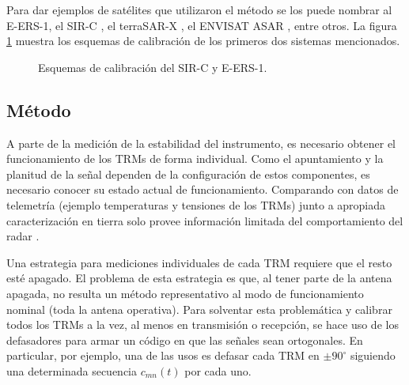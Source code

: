 Para dar ejemplos de satélites que utilizaron el método se los puede nombrar al E-ERS-1, el SIR-C \cite{Curlander1991}, el 
terraSAR-X \cite{Schwerdt2005}, el ENVISAT ASAR \cite{Loop}, entre otros. La figura \ref{fig:calibrMethods} muestra los esquemas
de calibración de los primeros dos sistemas mencionados.

\begin{figure}[H]
	\centering
	\caption{Esquemas de calibración del SIR-C y E-ERS-1.}
	\label{fig:calibrMethods}
\end{figure}


\subsection{Método} \label{ssc:classicalMethod}

A parte de la medición de la estabilidad del instrumento, es necesario obtener el funcionamiento de los TRMs de forma 
individual. Como el apuntamiento y la planitud de la señal dependen de la configuración de estos componentes, es necesario 
conocer su estado actual de funcionamiento. Comparando con datos de telemetría (ejemplo temperaturas y tensiones de los 
TRMs) junto a apropiada caracterización en tierra solo provee información limitada del comportamiento del radar \cite{Br2007}.

Una estrategia para mediciones individuales de cada TRM requiere que el resto esté apagado. El problema de esta estrategia 
es que, al tener parte de la antena apagada, no resulta un método representativo al modo de funcionamiento nominal (toda la 
antena operativa). Para solventar esta problemática y calibrar todos los TRMs a la vez, al menos en transmisión o recepción,
se hace uso de los defasadores para armar un código en que las señales sean ortogonales. En particular, por ejemplo, una de
las usos es defasar cada TRM en $\pm90^{\circ}$ siguiendo una determinada secuencia $c_{mn}(t)$ por cada uno.

